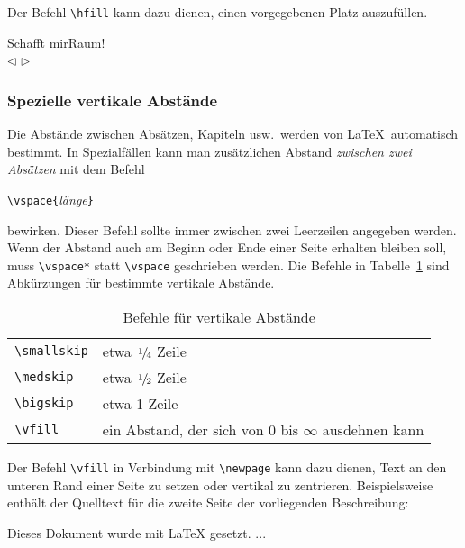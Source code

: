 Der Befehl \lstinline|\hfill|  kann dazu dienen, einen vorgegebenen Platz auszufüllen.

\begin{LTXexample}
\raggedright
Schafft mir\hspace{1.5cm}Raum! \\
$\triangleleft$\hfill 
$\triangleright$
\end{LTXexample}



\subsubsection{Spezielle vertikale Abstände} \label{vabstaende}
 
Die Abstände zwischen Absätzen, Kapiteln usw.\ werden von
\LaTeX\ automatisch bestimmt.
In Spezialfällen kann man zusätzlichen Abstand
\emph{zwischen zwei Absätzen} mit dem Befehl
\begin{beispiel}
\lstinline|\vspace{|\textit{länge}\lstinline|}|
\end{beispiel}
bewirken.
Dieser Befehl sollte immer zwischen zwei Leerzeilen angegeben
werden.
Wenn der Abstand auch am Beginn oder Ende einer Seite erhalten
bleiben soll, muss \lstinline|\vspace*| statt \lstinline|\vspace|
geschrieben werden.
Die Befehle in Tabelle~\ref{vspace} sind Abkürzungen für
bestimmte vertikale Abstände.
\begin{table}[!htb]
\caption{Befehle für vertikale Abstände} \label{vspace}
\centering
\def\arraystretch{1.25}
\begin{tabular}{@{}ll@{}}
\toprule
\lstinline|\smallskip| & etwa $\nfrac{1}{4}$ Zeile \\
\lstinline|\medskip|   & etwa $\nfrac{1}{2}$ Zeile \\
\lstinline|\bigskip|   & etwa 1 Zeile \\
\lstinline|\vfill|     & ein Abstand, der sich von 0 bis $\infty$
                     ausdehnen kann\\
\bottomrule
\end{tabular}
\end{table}

Der Befehl \lstinline|\vfill| in Verbindung mit \lstinline|\newpage|
kann dazu dienen, Text an den unteren Rand einer Seite zu setzen
oder vertikal zu zentrieren.  Beispielsweise enthält der Quelltext
für die zweite Seite der vorliegenden Beschreibung:
\clearpage
\begin{example}
\vfill

Dieses Dokument wurde mit \LaTeX{} gesetzt.
...
\newpage
\end{example}

